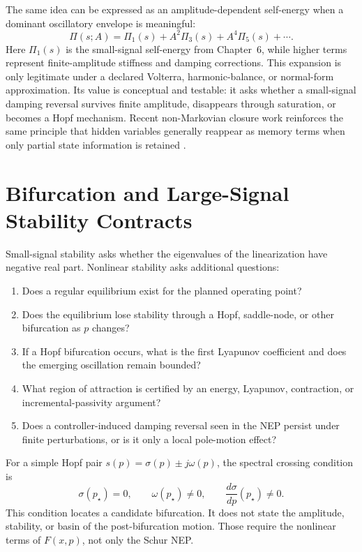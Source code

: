 The same idea can be expressed as an amplitude-dependent self-energy when a
dominant oscillatory envelope is meaningful:
\begin{equation}
  \Pi(s;A)
  =
  \Pi_1(s)
  +
  A^2\Pi_3(s)
  +
  A^4\Pi_5(s)
  +\cdots .
  \label{eq:nonlin_amplitude_dependent_pi}
\end{equation}
Here \(\Pi_1(s)\) is the small-signal self-energy from Chapter~6, while higher
terms represent finite-amplitude stiffness and damping corrections. This
expansion is only legitimate under a declared Volterra, harmonic-balance, or
normal-form approximation. Its value is conceptual and testable: it asks
whether a small-signal damping reversal survives finite amplitude, disappears
through saturation, or becomes a Hopf mechanism. Recent non-Markovian closure
work reinforces the same principle that hidden variables generally reappear as
memory terms when only partial state information is retained
\cite{monsel2024neuraldde}.

\section{Bifurcation and Large-Signal Stability Contracts}

Small-signal stability asks whether the eigenvalues of the linearization have
negative real part. Nonlinear stability asks additional questions:
\begin{enumerate}
\item Does a regular equilibrium exist for the planned operating point?
\item Does the equilibrium lose stability through a Hopf, saddle-node, or
other bifurcation as \(p\) changes?
\item If a Hopf bifurcation occurs, what is the first Lyapunov coefficient and
does the emerging oscillation remain bounded?
\item What region of attraction is certified by an energy, Lyapunov,
contraction, or incremental-passivity argument?
\item Does a controller-induced damping reversal seen in the NEP persist under
finite perturbations, or is it only a local pole-motion effect?
\end{enumerate}

For a simple Hopf pair \(s(p)=\sigma(p)\pm j\omega(p)\), the spectral crossing
condition is
\begin{equation}
  \sigma(p_\star)=0,\qquad
  \omega(p_\star)\ne0,\qquad
  \frac{d\sigma}{dp}(p_\star)\ne0.
  \label{eq:nonlin_hopf_crossing}
\end{equation}
This condition locates a candidate bifurcation. It does not state the
amplitude, stability, or basin of the post-bifurcation motion. Those require
the nonlinear terms of \(F(x,p)\), not only the Schur NEP.


